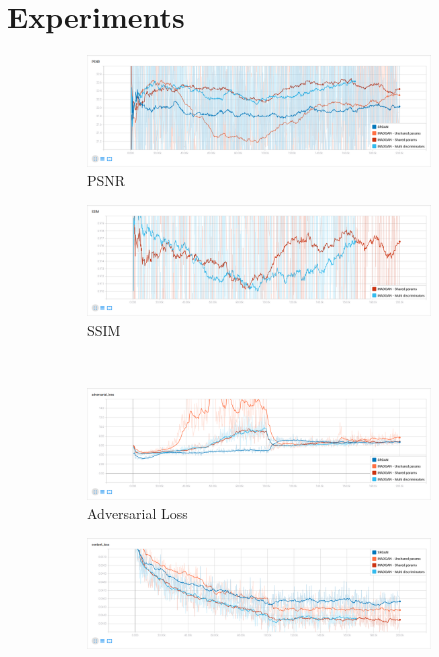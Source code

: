 \documentclass[12pt,a4paper,twocolumn]{article}
\begin{document}
    \section{Experiments}
        \begin{figure}
            \centering
            \begin{subfigure}{0.48\textwidth}
                \includegraphics[width=\textwidth]{images/psnr.png}
                \caption{PSNR}
            \end{subfigure}
            \quad
            \begin{subfigure}{0.48\textwidth}
                \includegraphics[width=\textwidth]{images/ssim.png}
                \caption{SSIM}
            \end{subfigure}\\[5mm]
            \begin{subfigure}{0.48\textwidth}
                \includegraphics[width=\textwidth]{images/adv-loss.png}
                \caption{Adversarial Loss}
            \end{subfigure}
            \quad
            \begin{subfigure}{0.48\textwidth}
                \includegraphics[width=\textwidth]{images/cont-loss.png}

\end{subfigure}
\end{figure}
\end{document}
